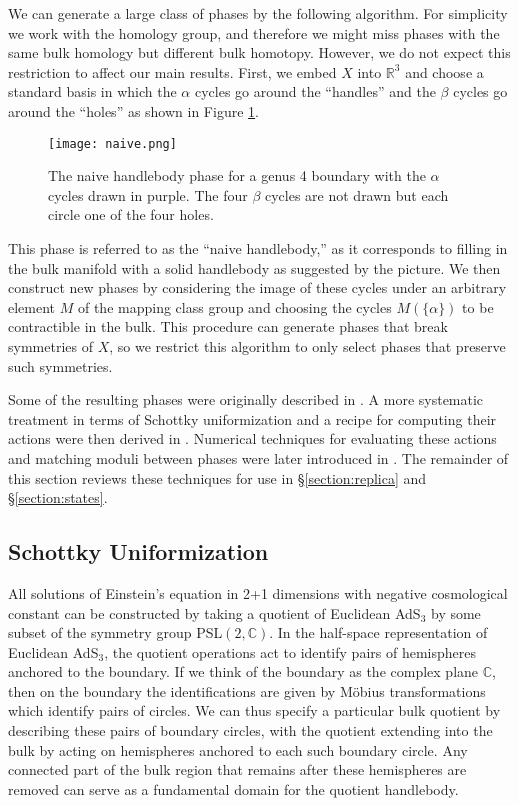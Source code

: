 \documentclass[letterpaper,12pt]{article}
\begin{document}
We can generate a large class of phases by the following algorithm. For simplicity we work with the homology group, and therefore we might miss phases with the same bulk homology but different bulk homotopy. However, we do not expect this restriction to affect our main results. First, we embed $X$ into $\mathbb R^3$ and choose a standard basis in which the $\alpha$ cycles go around the ``handles'' and the $\beta$ cycles go around the ``holes'' as shown in Figure \ref{fig:naive}.
\begin{figure}[ht!]
\centering
\texttt{[image: naive.png]}
\caption{
The naive handlebody phase for a genus 4 boundary with the $\alpha$ cycles drawn in purple. The four $\beta$ cycles are not drawn but each circle one of the four holes. \label{fig:naive}
}
\end{figure}
This phase is referred to as the ``naive handlebody,'' as it corresponds to filling in the bulk manifold with a solid handlebody as suggested by the picture. We then construct new phases by considering the image of these cycles under an arbitrary element $M$ of the mapping class group and choosing the cycles $M(\{\alpha\})$ to be contractible in the bulk. This procedure can generate phases that break symmetries of $X$, so we restrict this algorithm to only select phases that preserve such symmetries.

Some of the resulting phases were originally described in \cite{Brill1,Brill2}. A more systematic treatment in terms of Schottky uniformization and a recipe for computing their actions were then derived in \cite{Krasnov1, Krasnov2}. Numerical techniques for evaluating these actions and matching moduli between phases were later  introduced in \cite{MRW}. The remainder of this section reviews these techniques for use in \S\ref{section:replica} and \S\ref{section:states}.

\subsection{Schottky Uniformization}
\label{sec:SU}

All solutions of Einstein's equation in 2+1 dimensions with negative cosmological constant can be constructed by taking a quotient of Euclidean AdS$_3$ by some subset of the symmetry group PSL$(2,\mathbb C)$. In the half-space representation of Euclidean AdS$_3$, the quotient operations act to identify pairs of hemispheres anchored to the boundary. If we think of the boundary as the complex plane $\mathbb C$, then on the boundary the identifications are given by M\"obius transformations which identify pairs of circles. We can thus specify a particular bulk quotient by describing these pairs of boundary circles, with the quotient extending into the bulk by acting on hemispheres anchored to each such boundary circle. Any connected part of the bulk region that remains after these hemispheres are removed can serve as a fundamental domain for the quotient handlebody.
\end{document}
